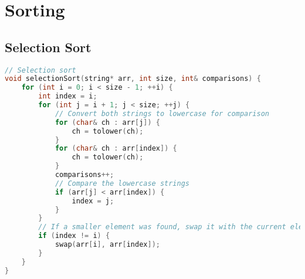 \documentclass[letterpaper, 10pt,DIV=13]{scrartcl}
\numberwithin{equation}{section} %
\numberwithin{figure}{section} %
\numberwithin{table}{section} %
\begin{document}

\pagebreak


\section{Sorting}
\subsection{Selection Sort}
\begin{linenumbers}
\begin{lstlisting}[language=C++, caption={Selection Sort}, label={code:example}]
// Selection sort 
void selectionSort(string* arr, int size, int& comparisons) {
    for (int i = 0; i < size - 1; ++i) {
        int index = i;
        for (int j = i + 1; j < size; ++j) {
            // Convert both strings to lowercase for comparison
            for (char& ch : arr[j]) {
                ch = tolower(ch);
            }
            for (char& ch : arr[index]) {
                ch = tolower(ch);
            }
            comparisons++;
            // Compare the lowercase strings
            if (arr[j] < arr[index]) {
                index = j;
            }
        }
        // If a smaller element was found, swap it with the current element
        if (index != i) {
            swap(arr[i], arr[index]);
        }
    }
}
\end{lstlisting}
\end{linenumbers}
\nolinenumbers
\end{document}
